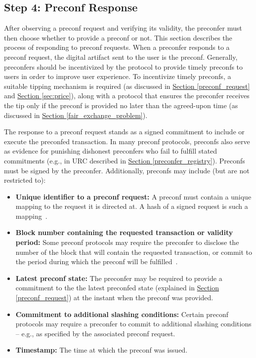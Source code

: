 \documentclass[a4paper]{article}
\theoremstyle{boldstyle}
\begin{document}
    
\subsection{Step 4: Preconf Response} \label{preconf_response}
      
    After observing a preconf request and verifying its validity, the preconfer must then choose whether to provide a preconf or not. This section describes the process of responding to preconf requests. When a preconfer responds to a preconf request, the digital artifact sent to the user is the preconf. Generally, preconfers should be incentivized by the protocol to provide timely preconfs to users in order to improve user experience. To incentivize timely preconfs, a suitable tipping mechanism is required (as discussed in \hyperref[preconf_request]{Section \ref{preconf_request}} and \hyperref[sec:price]{Section \ref{sec:price}}), along with a protocol that ensures the preconfer receives the tip only if the preconf is provided no later than the agreed-upon time (as discussed in \hyperref[fair_exchange_problem]{Section  \ref{fair_exchange_problem}}). 

    
    The response to a preconf request stands as a signed commitment to include or execute the preconfed transaction. In many preconf protocols, preconfs also serve as evidence for punishing dishonest preconfers who fail to fulfill stated commitments (e.g., in URC described in \hyperref[preconfer_registry]{Section \ref{preconfer_registry}}).
    Preconfs must be signed by the preconfer. Additionally, preconfs may include (but are not restricted to):
    \begin{itemize}
        \item \textbf{Unique identifier to a preconf request:}
        A preconf must contain a unique mapping to the request it is directed at. A hash of a signed request is such a mapping~\cite{W:Documentation-Commitments}.
        
        \item \textbf{Block number containing the requested transaction or validity period:} Some preconf protocols may require the preconfer to disclose the number of the block that will contain the requested transaction, or commit to the period during which the preconf will be fulfilled~\cite{W:Towardsanimplementationofbasedpreconfirmationsleveragingrestaking}.

        \item \textbf{Latest preconf state:}
        The preconfer may be required to provide a commitment to the  the latest preconfed state (explained in \hyperref[preconf_request]{Section \ref{preconf_request}}) at the instant when the preconf was provided. 
        
        \item \textbf{Commitment to additional slashing conditions:} Certain preconf protocols may require a preconfer to commit to additional slashing conditions -- e.g., as specified by the associated preconf request.
        \item \textbf{Timestamp:} The time at which the preconf was issued.
        
    \end{itemize}
\end{document}
